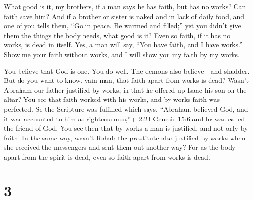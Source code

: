  What good is it, my brothers, if a man says he has faith,
but has no works? Can faith save him?  And if a brother or
sister is naked and in lack of daily food,  and one of you
tells them, ``Go in peace. Be warmed and filled;'' yet you didn't give
them the things the body needs, what good is it?  Even so
faith, if it has no works, is dead in itself.  Yes, a man
will say, ``You have faith, and I have works.'' Show me your faith
without works, and I will show you my faith by my works.

 You believe that God is one. You do well. The demons also
believe---and shudder.  But do you want to know, vain man,
that faith apart from works is dead?  Wasn't Abraham our
father justified by works, in that he offered up Isaac his son on the
altar?  You see that faith worked with his works, and by
works faith was perfected.  So the Scripture was fulfilled
which says, ``Abraham believed God, and it was accounted to him as
righteousness,''+ 2:23 Genesis 15:6 and he was called the friend of God.
 You see then that by works a man is justified, and not
only by faith.  In the same way, wasn't Rahab the
prostitute also justified by works when she received the messengers and
sent them out another way?  For as the body apart from the
spirit is dead, even so faith apart from works is dead.

\hypertarget{section-2}{%
\section{3}\label{section-2}}

